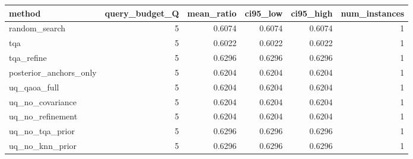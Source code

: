 \begin{tabular}{lrrrrr}
\toprule
method & query_budget_Q & mean_ratio & ci95_low & ci95_high & num_instances \\
\midrule
random_search & 5 & 0.6074 & 0.6074 & 0.6074 & 1 \\
tqa & 5 & 0.6022 & 0.6022 & 0.6022 & 1 \\
tqa_refine & 5 & 0.6296 & 0.6296 & 0.6296 & 1 \\
posterior_anchors_only & 5 & 0.6204 & 0.6204 & 0.6204 & 1 \\
uq_qaoa_full & 5 & 0.6204 & 0.6204 & 0.6204 & 1 \\
uq_no_covariance & 5 & 0.6204 & 0.6204 & 0.6204 & 1 \\
uq_no_refinement & 5 & 0.6204 & 0.6204 & 0.6204 & 1 \\
uq_no_tqa_prior & 5 & 0.6296 & 0.6296 & 0.6296 & 1 \\
uq_no_knn_prior & 5 & 0.6296 & 0.6296 & 0.6296 & 1 \\
\bottomrule
\end{tabular}
